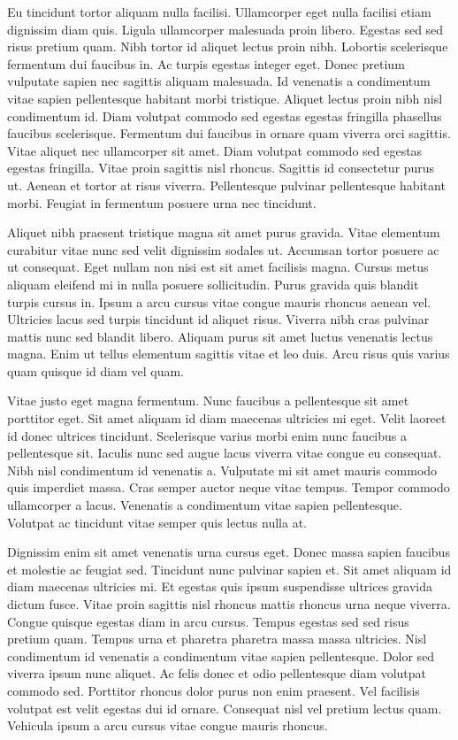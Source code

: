 \documentclass[11pt,a4paper]{article}
\begin{document}
Eu tincidunt tortor aliquam nulla facilisi. Ullamcorper eget nulla facilisi etiam dignissim diam quis. Ligula ullamcorper malesuada proin libero. Egestas sed sed risus pretium quam. Nibh tortor id aliquet lectus proin nibh. Lobortis scelerisque fermentum dui faucibus in. Ac turpis egestas integer eget. Donec pretium vulputate sapien nec sagittis aliquam malesuada. Id venenatis a condimentum vitae sapien pellentesque habitant morbi tristique. Aliquet lectus proin nibh nisl condimentum id. Diam volutpat commodo sed egestas egestas fringilla phasellus faucibus scelerisque. Fermentum dui faucibus in ornare quam viverra orci sagittis. Vitae aliquet nec ullamcorper sit amet. Diam volutpat commodo sed egestas egestas fringilla. Vitae proin sagittis nisl rhoncus. Sagittis id consectetur purus ut. Aenean et tortor at risus viverra. Pellentesque pulvinar pellentesque habitant morbi. Feugiat in fermentum posuere urna nec tincidunt.

Aliquet nibh praesent tristique magna sit amet purus gravida. Vitae elementum curabitur vitae nunc sed velit dignissim sodales ut. Accumsan tortor posuere ac ut consequat. Eget nullam non nisi est sit amet facilisis magna. Cursus metus aliquam eleifend mi in nulla posuere sollicitudin. Purus gravida quis blandit turpis cursus in. Ipsum a arcu cursus vitae congue mauris rhoncus aenean vel. Ultricies lacus sed turpis tincidunt id aliquet risus. Viverra nibh cras pulvinar mattis nunc sed blandit libero. Aliquam purus sit amet luctus venenatis lectus magna. Enim ut tellus elementum sagittis vitae et leo duis. Arcu risus quis varius quam quisque id diam vel quam.

Vitae justo eget magna fermentum. Nunc faucibus a pellentesque sit amet porttitor eget. Sit amet aliquam id diam maecenas ultricies mi eget. Velit laoreet id donec ultrices tincidunt. Scelerisque varius morbi enim nunc faucibus a pellentesque sit. Iaculis nunc sed augue lacus viverra vitae congue eu consequat. Nibh nisl condimentum id venenatis a. Vulputate mi sit amet mauris commodo quis imperdiet massa. Cras semper auctor neque vitae tempus. Tempor commodo ullamcorper a lacus. Venenatis a condimentum vitae sapien pellentesque. Volutpat ac tincidunt vitae semper quis lectus nulla at.

Dignissim enim sit amet venenatis urna cursus eget. Donec massa sapien faucibus et molestie ac feugiat sed. Tincidunt nunc pulvinar sapien et. Sit amet aliquam id diam maecenas ultricies mi. Et egestas quis ipsum suspendisse ultrices gravida dictum fusce. Vitae proin sagittis nisl rhoncus mattis rhoncus urna neque viverra. Congue quisque egestas diam in arcu cursus. Tempus egestas sed sed risus pretium quam. Tempus urna et pharetra pharetra massa massa ultricies. Nisl condimentum id venenatis a condimentum vitae sapien pellentesque. Dolor sed viverra ipsum nunc aliquet. Ac felis donec et odio pellentesque diam volutpat commodo sed. Porttitor rhoncus dolor purus non enim praesent. Vel facilisis volutpat est velit egestas dui id ornare. Consequat nisl vel pretium lectus quam. Vehicula ipsum a arcu cursus vitae congue mauris rhoncus.
\end{document}
